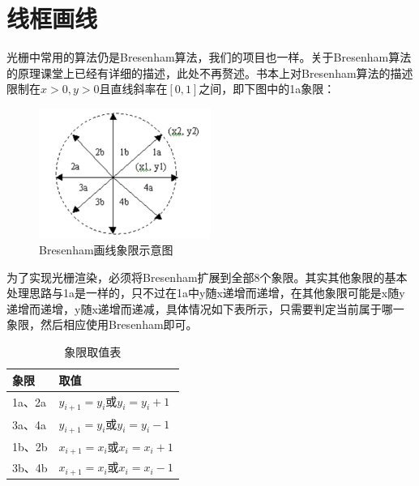     \section{线框画线}
    \begin{spacing}{2.5}
    光栅中常用的算法仍是Bresenham算法，我们的项目也一样。关于Bresenham算法的原理课堂上已经有详细的描述，此处不再赘述。书本上对Bresenham算法的描述限制在$x > 0, y > 0$且直线斜率在$[0,1]$之间，即下图中的1a象限：
    \begin{figure}[H]
		\centering
		\includegraphics[width=0.5\textwidth]{images/block.png}
		\caption{Bresenham画线象限示意图}
		\label{block}
	\end{figure}
	为了实现光栅渲染，必须将Bresenham扩展到全部8个象限。其实其他象限的基本处理思路与1a是一样的，只不过在1a中y随x递增而递增，在其他象限可能是x随y递增而递增，y随x递增而递减，具体情况如下表所示，只需要判定当前属于哪一象限，然后相应使用Bresenham即可。
	\begin{table}[H]
	\begin{center}
    \begin{tabular}{p{5cm}|p{5cm}}
        \hline
        象限 & 取值\\
        \hline
        1a、2a &  $y_{i+1}=y_{i}$或$y_{i} = y_{i}+1$\\
        \hline
        3a、4a & $y_{i+1}=y_{i}$或$y_{i} = y_{i}-1$\\
        \hline
        1b、2b & $x_{i+1}=x_{i}$或$x_{i} = x_{i}+1$\\
        \hline
        3b、4b & $x_{i+1}=x_{i}$或$x_{i} = x_{i}-1$\\
        \hline
    \end{tabular}
	\end{center}
	\caption{象限取值表}
	\end{table}
    \end{spacing}




